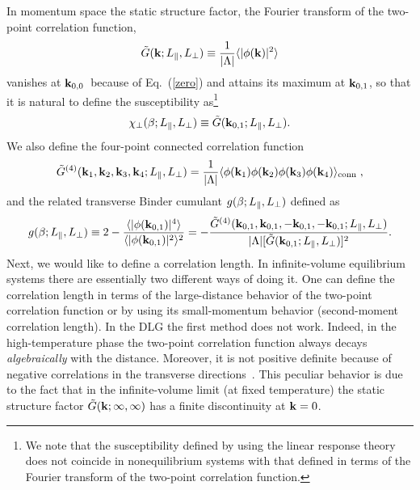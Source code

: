 \documentclass[12pt]{article}
\begin{document}
In momentum space the static structure factor, the Fourier transform of the 
two-point correlation function,
\begin{equation}
        \tilde{G}({\bf k}; L_{\|},L_{\bot})\equiv 
        {1\over |\Lambda|} \langle|\phi({\bf k})|^{2}\rangle
\label{statstrfa}
\end{equation}
vanishes at ${\bf k}_{0,0}$\ because of Eq.~(\ref{zero}) and attains 
its maximum at
${\bf k}_{0,1}$, so that it is natural to define the susceptibility
as\footnote{We note that the susceptibility  defined by using the
  linear response theory does not coincide in nonequilibrium systems
  with that defined in terms of the Fourier transform of the two-point
  correlation function. }
\begin{equation}
        \chi_\bot(\beta;L_{\|},L_{\bot})\equiv 
    \tilde{G}({\bf k}_{0,1}; L_{\|},L_{\bot}).
\label{defChi}
\end{equation}
We also define the four-point connected correlation function
\begin{equation}
\tilde{G}^{(4)}({\bf k}_1, {\bf k}_2, {\bf k}_3, {\bf k}_4; L_\|,L_\bot) = 
   {1\over |\Lambda|} 
  \langle \phi({\bf k}_1) \phi({\bf k}_2) \phi({\bf k}_3) \phi({\bf k}_4)\rangle_{\rm conn}
  \; ,
\end{equation}
and the related transverse Binder cumulant $g(\beta;L_{\|}, L_{\bot})$
defined as
\begin{equation}
\label{defbinder}
g(\beta;L_{\|}, L_{\bot})  \equiv  2- 
\frac{\langle|\phi({\bf k}_{0,1})|^{4}\rangle}
{\langle|\phi({\bf k}_{0,1})|^{2}\rangle^2} = 
  - {\tilde{G}^{(4)}({\bf k}_{0,1}, {\bf k}_{0,1}, 
         -{\bf k}_{0,1}, -{\bf k}_{0,1}; L_\|,L_\bot) \over 
     |\Lambda| [\tilde{G}({\bf k}_{0,1};L_\|,L_\bot)]^2}.
\end{equation}
Next, we would like to define a correlation length. In infinite-volume 
equilibrium systems there are essentially two different ways 
of doing it. One can define the correlation length in terms of the 
large-distance behavior of the two-point correlation function or by using its
small-momentum behavior (second-moment correlation
length). In the DLG the first method does not work. 
Indeed, in the high-temperature phase the two-point correlation function 
always decays {\it algebraically} with the distance.
Moreover, it is not positive definite because of
negative correlations in the transverse directions~\cite{Schmittmann95}. 
This peculiar behavior is due to the fact
that in the infinite-volume limit (at fixed temperature)
the static structure factor 
$\tilde{G}({\bf k};\infty,\infty)$ has a finite discontinuity at ${\bf k}=0$. 
\end{document}
